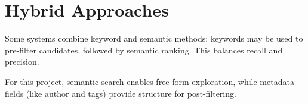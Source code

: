 \section*{Hybrid Approaches}
Some systems combine keyword and semantic methods: keywords may be used to pre-filter candidates, followed by semantic ranking. This balances recall and precision.

For this project, semantic search enables free-form exploration, while metadata fields (like author and tags) provide structure for post-filtering.
